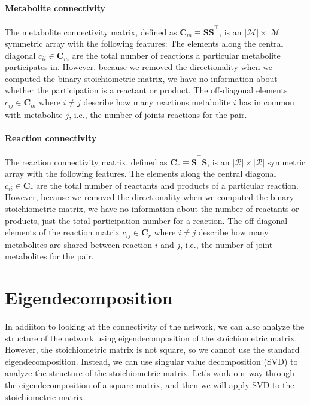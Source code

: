 \documentclass{article}[11pt]
\begin{document}
\paragraph*{Metabolite connectivity} The metabolite connectivity matrix, defined as $\mathbf{C}_{m} \equiv \bar{\mathbf{S}}\bar{\mathbf{S}}^{\top}$, is an $|\mathcal{M}|\times|\mathcal{M}|$ symmetric array with the following features:
The elements along the central diagonal $c_{ii}\in\mathbf{C}_{m}$ are the total number of reactions a particular metabolite participates in. 
However. because we removed the directionality when we computed the binary stoichiometric matrix, we have no information about whether the participation is a reactant or product.
The off-diagonal elements $c_{ij}\in\mathbf{C}_{m}$ where $i\neq{j}$ describe how many reactions metabolite $i$ has in common with metabolite $j$, i.e., the number of joints reactions for the pair.

\paragraph*{Reaction connectivity} The reaction connectivity matrix, defined as $\mathbf{C}_{r} \equiv \bar{\mathbf{S}}^{\top}\bar{\mathbf{S}}$, is an $|\mathcal{R}|\times|\mathcal{R}|$ symmetric array with the following features.
The elements along the central diagonal $c_{ii}\in\mathbf{C}_{r}$ are the total number of reactants and products of a particular reaction. 
However, because we removed the directionality when we computed the binary stoichiometric matrix, we have no information about the number of reactants or products, just the total participation number for a reaction.
The off-diagonal elements of the reaction matrix $c_{ij}\in\mathbf{C}_{r}$ where $i\neq{j}$ describe how many metabolites are shared between reaction $i$ and $j$, i.e., the number of joint metabolites for the pair.

\section{Eigendecomposition}
In addiiton to looking at the connectivity of the network, we can also analyze the structure of the network using eigendecomposition of the stoichiometric matrix.
However, the stoichiometric matrix is not square, so we cannot use the standard eigendecomposition. 
Instead, we can use singular value decomposition (SVD) to analyze the structure of the stoichiometric matrix. 
Let's work our way through the eigendecomposition of a square matrix, and then we will apply SVD to the stoichiometric matrix.
\end{document}
